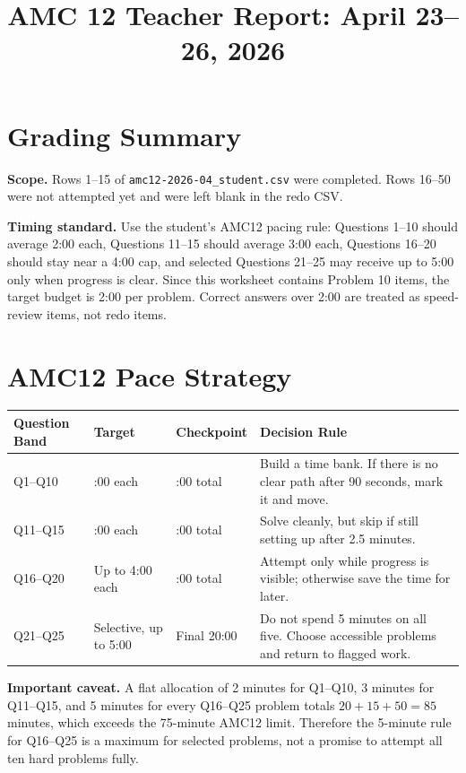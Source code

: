 \documentclass[11pt]{article}
\title{AMC 12 Teacher Report: April 23--26, 2026}
\author{}
\date{}
\begin{document}
\maketitle

\section{Grading Summary}

\textbf{Scope.} Rows 1--15 of \texttt{amc12-2026-04\_student.csv} were completed. Rows 16--50 were not attempted yet and were left blank in the redo CSV.

\textbf{Timing standard.} Use the student's AMC12 pacing rule: Questions 1--10 should average 2:00 each, Questions 11--15 should average 3:00 each, Questions 16--20 should stay near a 4:00 cap, and selected Questions 21--25 may receive up to 5:00 only when progress is clear. Since this worksheet contains Problem 10 items, the target budget is 2:00 per problem. Correct answers over 2:00 are treated as speed-review items, not redo items.

\section{AMC12 Pace Strategy}

\begin{longtable}{@{}>{\raggedright\arraybackslash}p{} >{\centering\arraybackslash}p{} >{\centering\arraybackslash}p{} >{\raggedright\arraybackslash}p{}@{}}
\textbf{Question Band} & \textbf{Target} & \textbf{Checkpoint} & \textbf{Decision Rule}\\
\hline
Q1--Q10 & 2:00 each & 20:00 total & Build a time bank. If there is no clear path after 90 seconds, mark it and move.\\
Q11--Q15 & 3:00 each & 35:00 total & Solve cleanly, but skip if still setting up after 2.5 minutes.\\
Q16--Q20 & Up to 4:00 each & 55:00 total & Attempt only while progress is visible; otherwise save the time for later.\\
Q21--Q25 & Selective, up to 5:00 & Final 20:00 & Do not spend 5 minutes on all five. Choose accessible problems and return to flagged work.\\
\end{longtable}

\textbf{Important caveat.} A flat allocation of 2 minutes for Q1--Q10, 3 minutes for Q11--Q15, and 5 minutes for every Q16--Q25 problem totals \(20+15+50=85\) minutes, which exceeds the 75-minute AMC12 limit. Therefore the 5-minute rule for Q16--Q25 is a maximum for selected problems, not a promise to attempt all ten hard problems fully.
\end{document}
